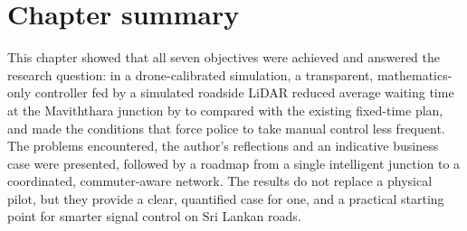 \section{Chapter summary}

This chapter showed that all seven objectives were achieved and answered the research question: in a drone-calibrated simulation, a transparent, mathematics-only controller fed by a simulated roadside LiDAR reduced average waiting time at the Maviththara junction by  to  compared with the existing fixed-time plan, and made the conditions that force police to take manual control less frequent. The problems encountered, the author's reflections and an indicative business case were presented, followed by a roadmap from a single intelligent junction to a coordinated, commuter-aware network. The results do not replace a physical pilot, but they provide a clear, quantified case for one, and a practical starting point for smarter signal control on Sri Lankan roads.
